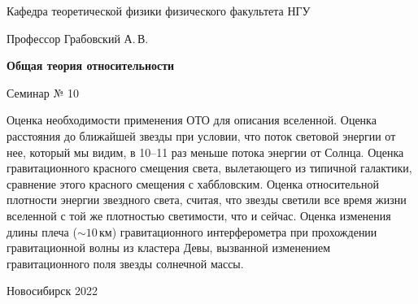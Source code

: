 \documentclass[12pt,pagesize,paper=192mm:108mm,landscape]{scrbook}
\begin{document}
\begin{titlepage}
\begin{center}
    Кафедра теоретической физики физического факультета НГУ

    \Large
    Профессор Грабовский А.\,В.

    \huge
    \textbf{Общая теория относительности}

    \Large
    Семинар № 10
    \vfill

    \normalsize
    \begin{minipage}{0.83\linewidth}
      Оценка необходимости применения ОТО для описания
      вселенной. Оценка расстояния до ближайшей звезды при условии,
      что поток световой энергии от нее, который мы видим, в 10--11 раз
      меньше потока энергии от Солнца. Оценка гравитационного красного
      смещения света, вылетающего из типичной галактики, сравнение
      этого красного смещения с хаббловским. Оценка относительной
      плотности энергии звездного света, считая, что звезды светили
      все время жизни вселенной с той же плотностью светимости, что и
      сейчас. Оценка изменения длины плеча ($\sim10$\,км) гравитационного
      интерферометра при прохождении гравитационной волны из кластера
      Девы, вызванной изменением гравитационного поля звезды солнечной
      массы.
    \end{minipage}
    \vfill

    \normalsize \ccbysa\hspace{0.5em}  Новосибирск 2022
  \end{center}
\end{titlepage}
\end{document}
